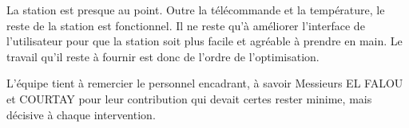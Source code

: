 \documentclass[a4paper]{report}
\begin{document}
La station est presque au point.
Outre la télécommande et la température, le reste de la station est fonctionnel.
Il ne reste qu’à améliorer l’interface de l’utilisateur pour que la station soit plus facile et agréable à prendre en main.
Le travail qu’il reste à fournir est donc de l’ordre de l’optimisation.

L’équipe tient à remercier le personnel encadrant, à savoir Messieurs EL FALOU et COURTAY pour leur contribution qui devait certes rester minime, mais décisive à chaque intervention.
\end{document}
